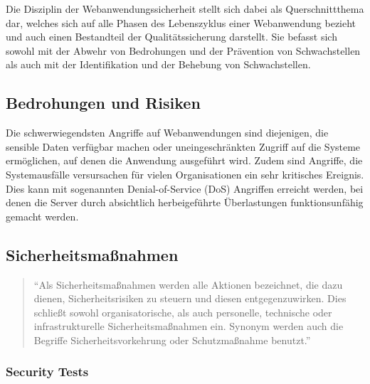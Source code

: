 \documentclass[12pt,oneside,a4paper,parskip]{scrbook}
\begin{document}
  Die Disziplin der Webanwendungssicherheit stellt sich dabei als Querschnittthema dar, welches sich auf alle
  Phasen des Lebenszyklus einer Webanwendung bezieht und auch einen Bestandteil der Qualitätssicherung
  darstellt. Sie befasst sich sowohl mit der Abwehr von Bedrohungen und der Prävention von Schwachstellen
  als auch mit der Identifikation und der Behebung von Schwachstellen. \cite{BSI}
  \subsection{Bedrohungen und Risiken}
  Die schwerwiegendsten Angriffe auf Webanwendungen sind diejenigen, die sensible Daten verfügbar machen oder uneingeschränkten Zugriff auf die Systeme ermöglichen, auf denen die Anwendung ausgeführt wird. Zudem sind Angriffe, die Systemausfälle versursachen für vielen Organisationen ein sehr kritisches Ereignis. Dies kann mit sogenannten Denial-of-Service (DoS) Angriffen erreicht werden, bei denen die Server durch absichtlich herbeigeführte Überlastungen funktionsunfähig gemacht werden.


  \subsection{Sicherheitsmaßnahmen}
    \begin{quote} ``Als Sicherheitsmaßnahmen werden alle Aktionen bezeichnet, die dazu dienen, Sicherheitsrisiken zu steuern und diesen entgegenzuwirken. Dies schließt sowohl organisatorische, als auch personelle, technische oder infrastrukturelle Sicherheitsmaßnahmen ein. Synonym werden auch die Begriffe Sicherheitsvorkehrung oder Schutzmaßnahme benutzt.'' \cite{BSI2}\end{quote}

  \subsubsection{Security Tests}
\end{document}

